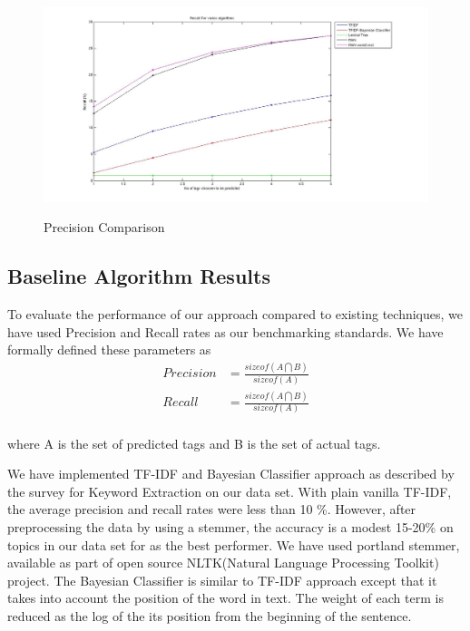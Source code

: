 \documentclass[dvips,9pt]{article}
\begin{document}
		\begin{figure}
			\centering
			\caption{Precision Comparison}
			\includegraphics[scale=0.3]{../baseline/recall.jpg}
            \label{recall}
		\end{figure}
		\subsection{Baseline Algorithm Results}
		
		
		To evaluate the performance of our approach compared to existing techniques, we have used Precision and Recall rates as our benchmarking standards.
		We have formally defined these parameters as 
		\begin{equation}
        \begin{aligned}
		Precision &= \frac{ sizeof(A \bigcap B)}{sizeof(A)} \\		
        Recall    &= \frac{ sizeof(A \bigcap B)}{sizeof(A)} \\
        \end{aligned}
        \end{equation}
            		
		where A is the set of predicted tags and B is the set of actual tags.
		
		We have implemented TF-IDF and Bayesian Classifier approach as described by the survey for Keyword Extraction on our data set. With plain vanilla TF-IDF, the average precision and recall rates were less than 10 \%. However, after preprocessing the data by using a stemmer, the accuracy is a modest 15-20\% on topics in our data set for as the best performer.
		We have used portland stemmer, available as part of open source NLTK(Natural Language Processing Toolkit) project.
		The Bayesian Classifier is similar to TF-IDF approach except that it takes into account the position of the word in text. The weight of each term is reduced as the log of the its position from the beginning of the sentence.
		
\end{document}
